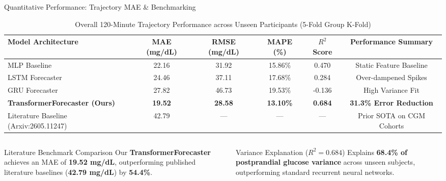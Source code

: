\documentclass[10pt,aspectratio=169]{beamer}
\begin{document}
\begin{frame}{Quantitative Performance: Trajectory MAE \& Benchmarking}
    \small
    \begin{table}
    \centering
    \caption{Overall 120-Minute Trajectory Performance across Unseen Participants (5-Fold Group K-Fold)}
    \begin{tabularx}{\textwidth}{X c c c c c}
        \toprule
        \rowcolor{RedHeader} \color{white}\textbf{Model Architecture} & \color{white}\textbf{MAE (mg/dL)} & \color{white}\textbf{RMSE (mg/dL)} & \color{white}\textbf{MAPE (\%)} & \color{white}\textbf{$R^2$ Score} & \color{white}\textbf{Performance Summary} \\
        \midrule
        MLP Baseline & 22.16 & 31.92 & 15.86\% & 0.470 & Static Feature Baseline \\
        LSTM Forecaster & 24.46 & 37.11 & 17.68\% & 0.284 & Over-dampened Spikes \\
        GRU Forecaster & 27.82 & 46.73 & 19.53\% & -0.136 & High Variance Fit \\
        \rowcolor{RedLight}
        \textbf{TransformerForecaster (Ours)} & \textbf{19.52} & \textbf{28.58} & \textbf{13.10\%} & \textbf{0.684} & \textcolor{GreenAccent}{\textbf{31.3\% Error Reduction}} \\
        \midrule
        Literature Baseline (Arxiv:2605.11247) & 42.79 & — & — & — & Prior SOTA on CGM Cohorts \\
        \bottomrule
    \end{tabularx}
    \end{table}

    \vspace{0.2cm}
    \begin{columns}
        \begin{block}{Literature Benchmark Comparison}
            \justifying
            Our \textbf{TransformerForecaster} achieves an MAE of \textbf{19.52 mg/dL}, outperforming published literature baselines (\textbf{42.79 mg/dL}) by \textbf{54.4\%}.
        \end{block}
        \begin{block}{Variance Explanation ($R^2 = 0.684$)}
            \justifying
            Explains \textbf{68.4\% of postprandial glucose variance} across unseen subjects, outperforming standard recurrent neural networks.
        \end{block}
    \end{columns}
\end{frame}
\end{document}
